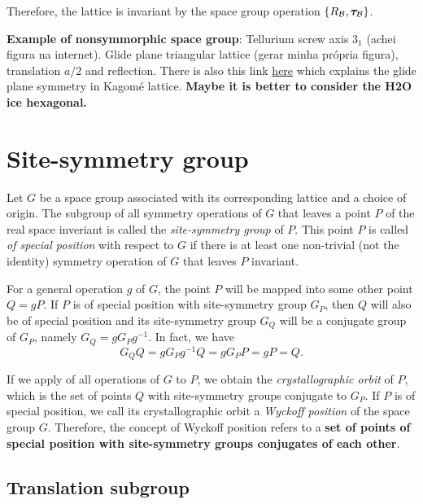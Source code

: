 Therefore, the lattice is invariant by the space group operation $\{R_{\mathcal{B}}, {\bm{\tau}}_{\mathcal{B}}\}$.

\n

\textbf{Example of nonsymmorphic space group}: Tellurium screw axis $3_1$ (achei figura na internet). Glide plane triangular lattice (gerar minha própria figura), translation $a/2$ and reflection. There is also this link \href{https://physics.stackexchange.com/questions/568476/example-of-a-space-group-which-does-not-contain-the-point-group-as-a-subgroup}{here} which explains the glide plane symmetry in Kagomé lattice. \textbf{Maybe it is better to consider the H2O ice hexagonal.}

\section{Site-symmetry group}

Let $G$ be a space group associated with its corresponding lattice and a choice of origin. The subgroup of all symmetry operations of $G$ that leaves a point $P$ of the real space inveriant is called the \textit{site-symmetry group} of $P$. This point $P$ is called \textit{of special position} with respect to $G$ if there is at least one non-trivial (not the identity) symmetry operation of $G$ that leaves $P$ invariant.

For a general operation $g$ of $G$, the point $P$ will be mapped into some other point $Q = g P$. If $P$ is of special position with site-symmetry group $G_P$, then $Q$ will also be of special position and its site-symmetry group $G_Q$ will be a conjugate group of $G_P$, namely $G_Q = g G_P g^{-1}$. In fact, we have
$$
G_Q Q = g G_P g^{-1} Q = g G_P P = g P = Q.
$$

If we apply of all operations of $G$ to $P$, we obtain the \textit{crystallographic orbit} of $P$, which is the set of points $Q$ with site-symmetry groups conjugate to $G_P$. If $P$ is of special position, we call its crystallographic orbit a \textit{Wyckoff position} of the space group $G$. Therefore, the concept of Wyckoff position refers to a \textbf{set of points of special position with site-symmetry groups conjugates of each other}.

\subsection{Translation subgroup}

